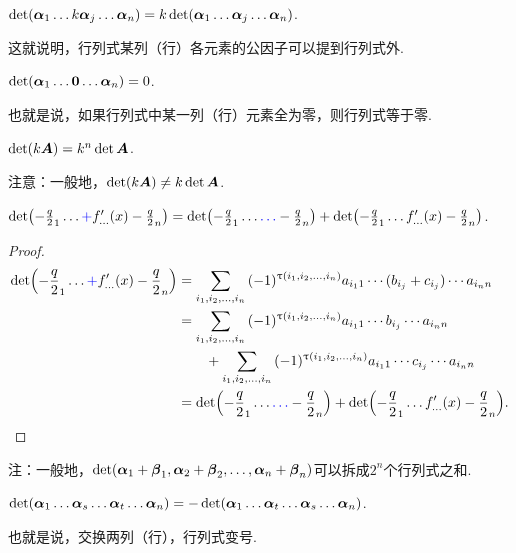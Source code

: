 \begin{property}\label{theorem:行列式.性质2}
\(\det (\boldsymbol{\alpha}_1 \dotso k\boldsymbol{\alpha}_j \dotso \boldsymbol{\alpha}_n)
=k\det (\boldsymbol{\alpha}_1 \dotso \boldsymbol{\alpha}_j \dotso \boldsymbol{\alpha}_n)\).
\end{property}
这就说明，行列式某列（行）各元素的公因子可以提到行列式外.

\begin{corollary}\label{theorem:行列式.性质2.推论1}
\(\det (\boldsymbol{\alpha}_1 \dotso \boldsymbol{0} \dotso \boldsymbol{\alpha}_n) = 0\).
\end{corollary}
也就是说，如果行列式中某一列（行）元素全为零，则行列式等于零.

\begin{corollary}\label{theorem:行列式.性质2.推论2}
\(\det (k\boldsymbol{A}) = k^n \det \boldsymbol{A}\).
\end{corollary}
注意：一般地，\(\det(k\boldsymbol{A}) \neq k \det\boldsymbol{A}\).

\begin{property}\label{theorem:行列式.性质3}
\(\det (-\frac{q}{2}_1 \dotso \textcolor{blue} + f_{\dotso}'(x) -\frac{q}{2}_n)
= \det (-\frac{q}{2}_1 \dotso \textcolor{blue} \dotso -\frac{q}{2}_n)
+ \det (-\frac{q}{2}_1 \dotso f_{\dotso}'(x) -\frac{q}{2}_n)\).
\begin{proof}
\begin{align*}
\det (-\frac{q}{2}_1 \dotso \textcolor{blue} + f_{\dotso}'(x) -\frac{q}{2}_n)
&= \sum\limits_{i_1,i_2,\dotsc,i_n}{
 (-1)^{\uptau(i_1,i_2,\dotsc,i_n)}
 a_{i_1 1} \dotsm (b_{i_j} + c_{i_j}) \dotsm a_{i_n n}
} \\
&= \sum\limits_{i_1,i_2,\dotsc,i_n}{
 (-1)^{\uptau(i_1,i_2,\dotsc,i_n)}
 a_{i_1 1} \dotsm b_{i_j} \dotsm a_{i_n n}
} \\
&\qquad+ \sum\limits_{i_1,i_2,\dotsc,i_n}{
 (-1)^{\uptau(i_1,i_2,\dotsc,i_n)}
 a_{i_1 1} \dotsm c_{i_j} \dotsm a_{i_n n}
} \\
&= \det (-\frac{q}{2}_1 \dotso \textcolor{blue} \dotso -\frac{q}{2}_n)
+ \det (-\frac{q}{2}_1 \dotso f_{\dotso}'(x) -\frac{q}{2}_n).
\qedhere
\end{align*}
\end{proof}
\end{property}
注：一般地，\(\det(\boldsymbol{\alpha}_1+\boldsymbol{\beta}_1,\boldsymbol{\alpha}_2+\boldsymbol{\beta}_2,\dotsc,\boldsymbol{\alpha}_n+\boldsymbol{\beta}_n)\)可以拆成\(2^n\)个行列式之和.

\begin{property}\label{theorem:行列式.性质4}
\(\det(\boldsymbol{\alpha}_1 \dotso \boldsymbol{\alpha}_s \dotso \boldsymbol{\alpha}_t \dotso \boldsymbol{\alpha}_n)
=-\det(\boldsymbol{\alpha}_1 \dotso \boldsymbol{\alpha}_t \dotso \boldsymbol{\alpha}_s \dotso \boldsymbol{\alpha}_n)\).
\end{property}
也就是说，交换两列（行），行列式变号.

